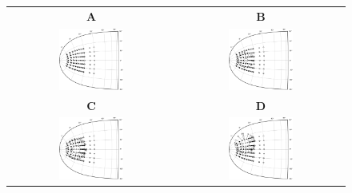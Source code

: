 \begin{figure}
  \begin{center}
    \begin{tabular}[t]{cc}
     {\textsf {\textbf A}} &
      {\textsf {\textbf B}} \\
      \includegraphics[width=0.4\textwidth]{figures/ch3_6_lesion-1} &
      \includegraphics[width=0.4\textwidth]{figures/ch3_6_lesion-2} \\
      {\textsf {\textbf C}} &
      {\textsf {\textbf D}} \\     
      \includegraphics[width=0.4\textwidth]{figures/ch3_6_lesion-3} &
      \includegraphics[width=0.4\textwidth]{figures/ch3_6_lesion-4} \\

\end{tabular}
\end{center}
\end{figure}
